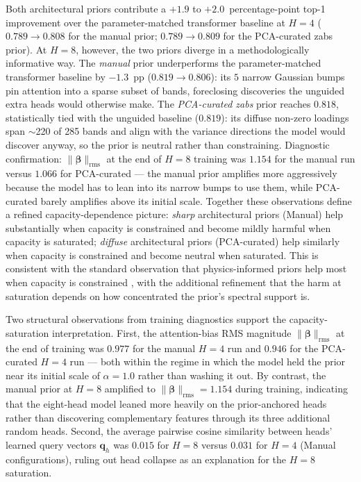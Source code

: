 \documentclass[11pt]{report}
\begin{document}
Both architectural priors contribute a $+1.9$ to $+2.0$~percentage-point top-1 improvement over the parameter-matched transformer baseline at $H = 4$ ($0.789 \to 0.808$ for the manual prior; $0.789 \to 0.809$ for the PCA-curated zabs prior). At $H = 8$, however, the two priors diverge in a methodologically informative way. The \emph{manual} prior underperforms the parameter-matched transformer baseline by $-1.3$~pp ($0.819 \to 0.806$): its $5$ narrow Gaussian bumps pin attention into a sparse subset of bands, foreclosing discoveries the unguided extra heads would otherwise make. The \emph{PCA-curated zabs} prior reaches $0.818$, statistically tied with the unguided baseline ($0.819$): its diffuse non-zero loadings span $\sim$220 of 285 bands and align with the variance directions the model would discover anyway, so the prior is neutral rather than constraining. Diagnostic confirmation: $\|\bm{\beta}\|_{\text{rms}}$ at the end of $H = 8$ training was $1.154$ for the manual run versus $1.066$ for PCA-curated --- the manual prior amplifies more aggressively because the model has to lean into its narrow bumps to use them, while PCA-curated barely amplifies above its initial scale. Together these observations define a refined capacity-dependence picture: \emph{sharp} architectural priors (Manual) help substantially when capacity is constrained and become mildly harmful when capacity is saturated; \emph{diffuse} architectural priors (PCA-curated) help similarly when capacity is constrained and become neutral when saturated. This is consistent with the standard observation that physics-informed priors help most when capacity is constrained \cite{raissi2019pinn, karpatne2017tgds}, with the additional refinement that the harm at saturation depends on how concentrated the prior's spectral support is.

Two structural observations from training diagnostics support the capacity-saturation interpretation. First, the attention-bias RMS magnitude $\|\bm{\beta}\|_{\text{rms}}$ at the end of training was $0.977$ for the manual $H = 4$ run and $0.946$ for the PCA-curated $H = 4$ run --- both within the regime in which the model held the prior near its initial scale of $\alpha = 1.0$ rather than washing it out. By contrast, the manual prior at $H = 8$ amplified to $\|\bm{\beta}\|_{\text{rms}} = 1.154$ during training, indicating that the eight-head model leaned more heavily on the prior-anchored heads rather than discovering complementary features through its three additional random heads. Second, the average pairwise cosine similarity between heads' learned query vectors $\mathbf{q}_h$ was $0.015$ for $H = 8$ versus $0.031$ for $H = 4$ (Manual configurations), ruling out head collapse as an explanation for the $H = 8$ saturation.
\end{document}
